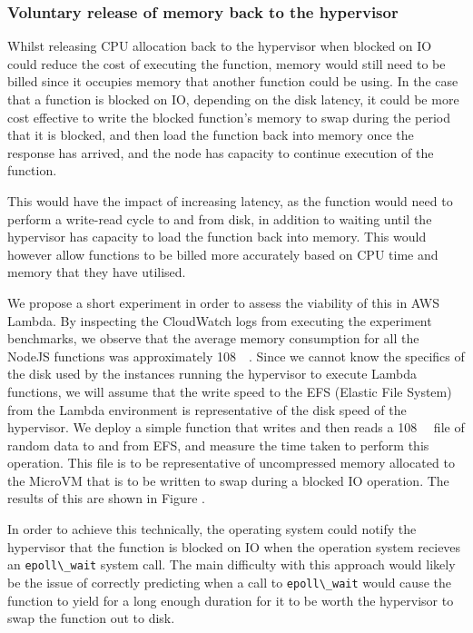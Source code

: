 \subsubsection{Voluntary release of memory back to the hypervisor}
Whilst releasing CPU allocation back to the hypervisor when blocked on IO could reduce the cost of executing the function, memory would still need to be billed since it occupies memory that another function could be using. In the case that a function is blocked on IO, depending on the disk latency, it could be more cost effective to write the blocked function's memory to swap during the period that it is blocked, and then load the function back into memory once the response has arrived, and the node has capacity to continue execution of the function.

This would have the impact of increasing latency, as the function would need to perform a write-read cycle to and from disk, in addition to waiting until the hypervisor has capacity to load the function back into memory. This would however allow functions to be billed more accurately based on CPU time and memory that they have utilised.

We propose a short experiment in order to assess the viability of this in AWS Lambda. By inspecting the CloudWatch logs from executing the experiment benchmarks, we observe that the average memory consumption for all the NodeJS functions was approximately \SI{108}{\mega\byte}. Since we cannot know the specifics of the disk used by the instances running the hypervisor to execute Lambda functions, we will assume that the write speed to the EFS (Elastic File System) from the Lambda environment is representative of the disk speed of the hypervisor. We deploy a simple function that writes and then reads a \SI{108}{\mega\byte} file of random data to and from EFS, and measure the time taken to perform this operation. This file is to be representative of uncompressed memory allocated to the MicroVM that is to be written to swap during a blocked IO operation. The results of this are shown in Figure .

In order to achieve this technically, the operating system could notify the hypervisor that the function is blocked on IO when the operation system recieves an \verb|epoll\_wait| system call. The main difficulty with this approach would likely be the issue of correctly predicting when a call to \verb|epoll\_wait| would cause the function to yield for a long enough duration for it to be worth the hypervisor to swap the function out to disk.

